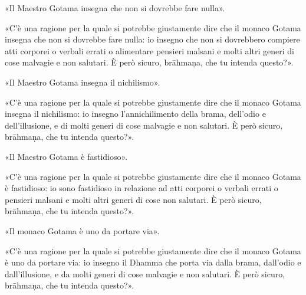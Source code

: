 «Il Maestro Gotama insegna che non si dovrebbe fare nulla».

«C’è una ragione per la quale si potrebbe giustamente dire che il monaco Gotama
insegna che non si dovrebbe fare nulla: io insegno che non si dovrebbero
compiere atti corporei o verbali errati o alimentare pensieri malsani e molti
altri generi di cose malvagie e non salutari. È però sicuro, brāhmaṇa, che tu
intenda questo?».

«Il Maestro Gotama insegna il nichilismo».

«C’è una ragione per la quale si potrebbe giustamente dire che il monaco Gotama
insegna il nichilismo: io insegno l’annichilimento della brama, dell’odio e
dell’illusione, e di molti generi di cose malvagie e non salutari. È però
sicuro, brāhmaṇa, che tu intenda questo?».

«Il Maestro Gotama è fastidioso».

«C’è una ragione per la quale si potrebbe giustamente dire che il monaco Gotama
è fastidioso: io sono fastidioso in relazione ad atti corporei o verbali errati
o pensieri malsani e molti altri generi di cose non salutari. È però sicuro,
brāhmaṇa, che tu intenda questo?».

«Il monaco Gotama è uno da portare via».

«C’è una ragione per la quale si potrebbe giustamente dire che il monaco Gotama
è uno da portare via: io insegno il Dhamma che porta via dalla brama, dall’odio
e dall’illusione, e da molti generi di cose malvagie e non salutari. È però
sicuro, brāhmaṇa, che tu intenda questo?».

